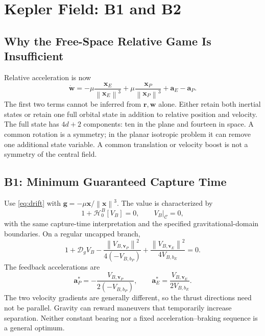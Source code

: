 \documentclass[journal,a4paper]{IEEEtran}
\newcommand{\C}{\mathcal C}
\newcommand{\D}{\mathcal D}
\newcommand{\HH}{\mathcal H}
\newcommand{\norm}[1]{\left\|#1\right\|}
\begin{document}
\section{Kepler Field: B1 and B2}
\label{sec:kepler}
\subsection{Why the Free-Space Relative Game Is Insufficient}
Relative acceleration is now
\begin{equation}
 \dot{\mathbf w}
 =-\mu\frac{\mathbf x_E}{\norm{\mathbf x_E}^3}
  +\mu\frac{\mathbf x_P}{\norm{\mathbf x_P}^3}
  +\mathbf a_E-\mathbf a_P.
 \label{eq:tidal}
\end{equation}
The first two terms cannot be inferred from $\mathbf r,\mathbf w$ alone. Either retain both inertial states or retain one full orbital state in addition to relative position and velocity. The full state has $4d+2$ components: ten in the plane and fourteen in space. A common rotation is a symmetry; in the planar isotropic problem it can remove one additional state variable. A common translation or velocity boost is not a symmetry of the central field.

\subsection{B1: Minimum Guaranteed Capture Time}
Use \eqref{eq:drift} with $\mathbf g=-\mu\mathbf x/\norm{\mathbf x}^3$. The value is characterized by
\begin{equation}
 \boxed{1+\HH^B_0[V_B]=0,\qquad V_B|_\C=0,}
 \label{eq:B1}
\end{equation}
with the same capture-time interpretation and the specified gravitational-domain boundaries. On a regular uncapped branch,
\begin{equation}
 1+\D_g V_B
 -\frac{\norm{V_{B,\mathbf v_P}}^2}{4(-V_{B,b_P})}
 +\frac{\norm{V_{B,\mathbf v_E}}^2}{4V_{B,b_E}}=0.
 \label{eq:B1expanded}
\end{equation}
The feedback accelerations are
\begin{equation}
 \boxed{\mathbf a_P^*=-\frac{V_{B,\mathbf v_P}}{2(-V_{B,b_P})},\qquad
        \mathbf a_E^*= \frac{V_{B,\mathbf v_E}}{2V_{B,b_E}}.}
 \label{eq:B1feedback}
\end{equation}
The two velocity gradients are generally different, so the thrust directions need not be parallel. Gravity can reward maneuvers that temporarily increase separation. Neither constant bearing nor a fixed acceleration--braking sequence is a general optimum.
\end{document}
